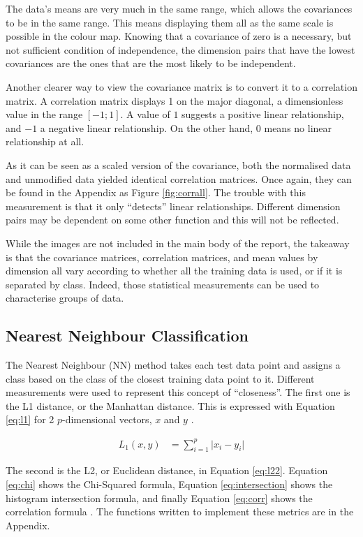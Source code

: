 \documentclass[a4paper, 10pt, conference]{ieeeconf}
\begin{document}
The data's means are very much in the same range, which allows the covariances to be in the same range. This means displaying them all as the same scale is possible in the colour map. Knowing that a covariance of zero is a necessary, but not sufficient condition of independence, the dimension pairs that have the lowest covariances are the ones that are the most likely to be independent.

Another clearer way to view the covariance matrix is to convert it to a correlation matrix. A correlation matrix displays 1 on the major diagonal, a dimensionless value in the range $[-1; 1]$. A value of $1$ suggests a positive linear relationship, and $-1$ a negative linear relationship. On the other hand, $0$ means no linear relationship at all.

As it can be seen as a scaled version of the covariance, both the normalised data and unmodified data yielded identical correlation matrices. Once again, they can be found in the Appendix as Figure \ref{fig:corrall}. The trouble with this measurement is that it only ``detects'' linear relationships. Different dimension pairs may be dependent on some other function and this will not be reflected.

While the images are not included in the main body of the report, the takeaway is that the covariance matrices, correlation matrices, and mean values by dimension all vary according to whether all the training data is used, or if it is separated by class. Indeed, those statistical measurements can be used to characterise groups of data.

\subsection{Nearest Neighbour Classification}
The Nearest Neighbour (NN) method takes each test data point and assigns a class based on the class of the closest training data point to it. Different measurements were used to represent this concept of ``closeness''. The first one is the L1 distance, or the Manhattan distance. This is expressed with Equation \ref{eq:l1} for 2 $p$-dimensional vectors, $x$ and $y$ \cite{metrics}.

\begin{align}
  L_1 \left( x, y \right) &= \sum_{i = 1}^{p} \lvert x_i  - y_i \rvert \label{eq:l1}
\end{align}

The second is the L2, or Euclidean distance, in Equation \ref{eq:l22}. Equation \ref{eq:chi} shows the Chi-Squared formula, Equation \ref{eq:intersection} shows the histogram intersection formula, and finally Equation \ref{eq:corr} shows the correlation formula \cite{metrics}. The functions written to implement these metrics are in the Appendix.
\end{document}
